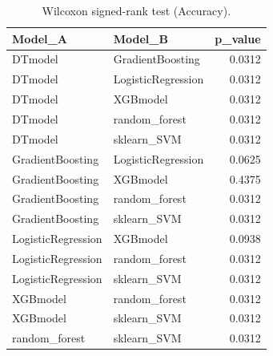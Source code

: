 \begin{table}[t]
\centering
\begin{tabular}{llr}
\toprule
Model_A & Model_B & p_value \\
\midrule
DTmodel & GradientBoosting & 0.0312 \\
DTmodel & LogisticRegression & 0.0312 \\
DTmodel & XGBmodel & 0.0312 \\
DTmodel & random_forest & 0.0312 \\
DTmodel & sklearn_SVM & 0.0312 \\
GradientBoosting & LogisticRegression & 0.0625 \\
GradientBoosting & XGBmodel & 0.4375 \\
GradientBoosting & random_forest & 0.0312 \\
GradientBoosting & sklearn_SVM & 0.0312 \\
LogisticRegression & XGBmodel & 0.0938 \\
LogisticRegression & random_forest & 0.0312 \\
LogisticRegression & sklearn_SVM & 0.0312 \\
XGBmodel & random_forest & 0.0312 \\
XGBmodel & sklearn_SVM & 0.0312 \\
random_forest & sklearn_SVM & 0.0312 \\
\bottomrule
\end{tabular}
\caption{Wilcoxon signed-rank test (Accuracy).}
\label{tab:wilcoxon_Accuracy}
\end{table}